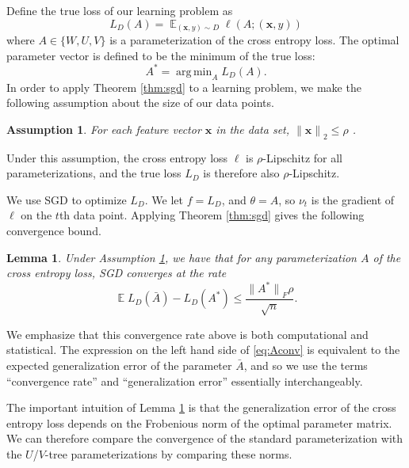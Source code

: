 \documentclass[twoside]{article}
\newtheorem{assumption}{Assumption}
\newtheorem{lemma}{Lemma}
\DeclareMathOperator{\E}{\mathbb E}
\DeclareMathOperator*{\argmin}{arg\,min}
\renewcommand{\star}[1]{{#1}^{*}}
\newcommand{\x}{\mathbf x}
\newcommand{\ltwo}[1]{{\lVert {#1} \rVert}_2}
\newcommand{\lF}[1]{{\lVert {#1} \rVert}_F}
\begin{document}
{Define the true loss of our learning problem as
\begin{equation}
    L_D(A) = \E_{(\x,y)\sim D} \ell(A; (\x, y))
\end{equation}
where $A \in \{W, U, V\}$ is a parameterization of the cross entropy loss.
The optimal parameter vector is defined to be the minimum of the true loss:
\begin{equation}
    \star A = \argmin_{A} L_D(A).
\end{equation}
In order to apply Theorem \ref{thm:sgd} to a learning problem,
we make the following assumption about the size of our data points.
\begin{assumption}
    \label{ass:lip}
    For each feature vector $\x$ in the data set, 
        $\ltwo{\x} \le \rho$
        .
\end{assumption}
Under this assumption, the cross entropy loss $\ell$ is $\rho$-Lipschitz for all parameterizations,
and the true loss $L_D$ is therefore also $\rho$-Lipschitz.

We use SGD to optimize $L_D$.
We let $f=L_D$, and $\theta = A$,
so $\nu_t$ is the gradient of $\ell$ on the $t$th data point.
Applying Theorem \ref{thm:sgd} gives the following convergence bound.
\begin{lemma}
    \label{ref:cor:A}
    Under Assumption \ref{ass:lip},
    we have that for any parameterization $A$ of the cross entropy loss,
    SGD converges at the rate
    \begin{equation}
        \E L_D(\bar A) - L_D(\star A) \le \frac{\lF{\star A}\rho}{\sqrt n}.
        \label{eq:Aconv}
    \end{equation}
\end{lemma}

We emphasize that this convergence rate above is both computational and statistical.
The expression on the left hand side of \eqref{eq:Aconv} is equivalent to the expected generalization error of the parameter $\bar A$,
and so we use the terms ``convergence rate'' and ``generalization error'' essentially interchangeably.

The important intuition of Lemma \ref{ref:cor:A} is that the generalization error of the cross entropy loss depends on the Frobenious norm of the optimal parameter matrix.
We can therefore compare the convergence of the standard parameterization with the $U$/$V$-tree parameterizations by comparing these norms.

}
\end{document}
